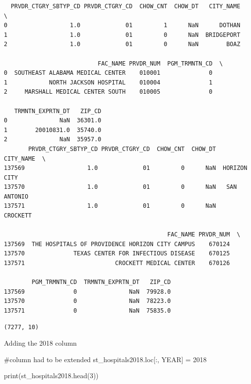 \documentclass[
  letterpaper,
  DIV=11,
  numbers=noendperiod]{scrartcl}
\newenvironment{Shaded}{\begin{snugshade}}{\end{snugshade}}
\newcommand{\BuiltInTok}[1]{\textcolor[rgb]{0.00,0.23,0.31}{#1}}
\newcommand{\CommentTok}[1]{\textcolor[rgb]{0.37,0.37,0.37}{#1}}
\newcommand{\DecValTok}[1]{\textcolor[rgb]{0.68,0.00,0.00}{#1}}
\newcommand{\NormalTok}[1]{\textcolor[rgb]{0.00,0.23,0.31}{#1}}
\newcommand{\OperatorTok}[1]{\textcolor[rgb]{0.37,0.37,0.37}{#1}}
\newcommand{\StringTok}[1]{\textcolor[rgb]{0.13,0.47,0.30}{#1}}
\begin{document}
\begin{verbatim}
  PRVDR_CTGRY_SBTYP_CD PRVDR_CTGRY_CD  CHOW_CNT  CHOW_DT   CITY_NAME  \
0                  1.0             01         1      NaN      DOTHAN   
1                  1.0             01         0      NaN  BRIDGEPORT   
2                  1.0             01         0      NaN        BOAZ   

                           FAC_NAME PRVDR_NUM  PGM_TRMNTN_CD  \
0  SOUTHEAST ALABAMA MEDICAL CENTER    010001              0   
1            NORTH JACKSON HOSPITAL    010004              1   
2     MARSHALL MEDICAL CENTER SOUTH    010005              0   

   TRMNTN_EXPRTN_DT   ZIP_CD  
0               NaN  36301.0  
1        20010831.0  35740.0  
2               NaN  35957.0  
       PRVDR_CTGRY_SBTYP_CD PRVDR_CTGRY_CD  CHOW_CNT  CHOW_DT     CITY_NAME  \
137569                  1.0             01         0      NaN  HORIZON CITY   
137570                  1.0             01         0      NaN   SAN ANTONIO   
137571                  1.0             01         0      NaN      CROCKETT   

                                               FAC_NAME PRVDR_NUM  \
137569  THE HOSPITALS OF PROVIDENCE HORIZON CITY CAMPUS    670124   
137570              TEXAS CENTER FOR INFECTIOUS DISEASE    670125   
137571                          CROCKETT MEDICAL CENTER    670126   

        PGM_TRMNTN_CD  TRMNTN_EXPRTN_DT   ZIP_CD  
137569              0               NaN  79928.0  
137570              0               NaN  78223.0  
137571              0               NaN  75835.0  
\end{verbatim}

\begin{verbatim}
(7277, 10)
\end{verbatim}

Adding the 2018 column

\begin{Shaded}
\begin{Highlighting}[]
\CommentTok{\#column had to be extended}
\NormalTok{st\_hospitals2018.loc[:, }\StringTok{\textquotesingle{}YEAR\textquotesingle{}}\NormalTok{] }\OperatorTok{=} \DecValTok{2018}

\BuiltInTok{print}\NormalTok{(st\_hospitals2018.head(}\DecValTok{3}\NormalTok{))}
\end{Highlighting}
\end{Shaded}
\end{document}
